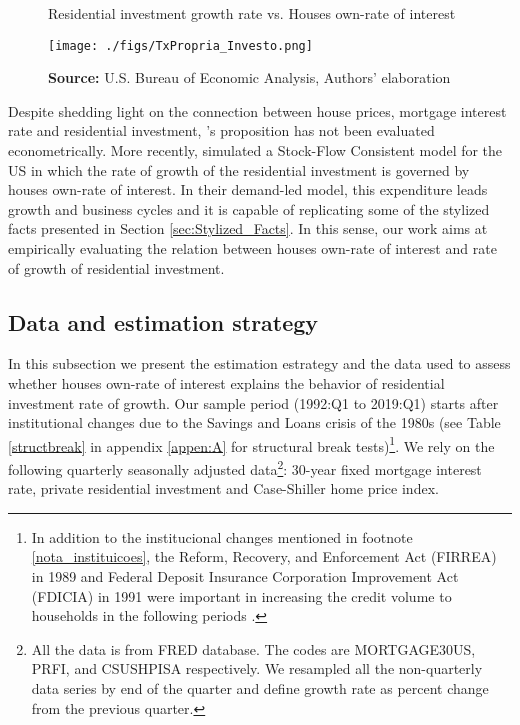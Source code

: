 \documentclass[12pt, a4paper]{article}
\begin{document}
\begin{figure}[htb]
	\centering
	\caption{Residential investment growth rate vs. Houses own-rate of interest}
	\label{propria_investo}
	\texttt{[image: ./figs/TxPropria\_Investo.png]}
	\caption*{\textbf{Source:} U.S. Bureau of Economic Analysis, Authors' elaboration}
\end{figure}

Despite shedding light on the connection between house prices, mortgage interest rate and residential investment, \citeauthor*{teixeira_crescimento_2015}'s \citeyear{teixeira_crescimento_2015} proposition has not been evaluated econometrically.
More recently, \textcite{petrini_2021_TD} simulated a Stock-Flow Consistent model for the US in which the rate of growth of the residential investment is governed by houses own-rate of interest.
In their demand-led model, this expenditure leads growth and business cycles and it is capable of replicating some of the stylized facts presented in Section \ref{sec:Stylized_Facts}.
In this sense, our work aims at empirically evaluating the relation between houses own-rate of interest and rate of growth of residential investment.


\subsection{Data and estimation strategy}
\label{sec:org3ce188c}
\label{sec:estimation}

In this subsection we present the estimation estrategy and the data used to assess whether houses own-rate of interest explains the behavior of residential investment rate of growth.
Our sample period (1992:Q1 to 2019:Q1) starts after institutional changes due to the Savings and Loans crisis of the 1980s (see Table \ref{structbreak} in appendix \ref{appen:A} for structural break tests)\footnote{In addition to the institucional changes mentioned in footnote  \ref{nota_instituicoes}, the Reform, Recovery, and Enforcement Act (FIRREA) in 1989 and Federal Deposit Insurance Corporation Improvement Act (FDICIA) in 1991 were important in increasing the credit volume to households in the following periods \cite{wall_too_2010}.}.
We rely on the following  quarterly seasonally adjusted data\footnote{All the data is from FRED database. The codes are MORTGAGE30US, PRFI, and CSUSHPISA respectively. We resampled all the non-quarterly data series by end of the quarter and define growth rate as percent change from the previous quarter.}: 30-year fixed mortgage interest rate, private residential investment and Case-Shiller home price index.
\end{document}
